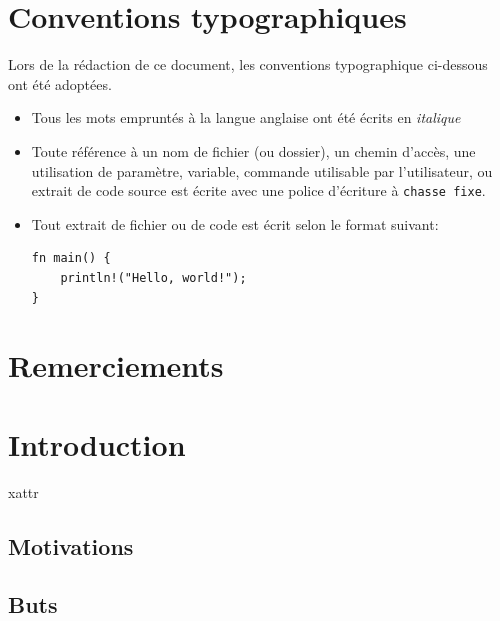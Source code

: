\documentclass[a4paper, 12pt]{article}
\newenvironment{code}{\captionsetup{type=listing}}{}
\begin{document}
\section*{Conventions typographiques}
Lors de la rédaction de ce document, les conventions typographique ci-dessous ont
été adoptées.
\begin{itemize}[label=\textbullet]
	\item Tous les mots empruntés à la langue anglaise ont été écrits en \textit{italique}
	\item Toute référence à un nom de fichier (ou dossier), un chemin d'accès, une 
    utilisation de paramètre, variable, commande utilisable par l'utilisateur, ou extrait de code 
    source est écrite avec une police d'écriture à \texttt{chasse fixe}.
	\item Tout extrait de fichier ou de code est écrit selon le format suivant:
    \bigbreak
    \begin{code}
        \begin{verbatim}
fn main() {
    println!("Hello, world!");
}
        \end{verbatim}
    \end{code}
\end{itemize}

\section*{Remerciements}

\newpage

\printglossary[type=\acronymtype,title={Acronymes}]
\newpage


\section{Introduction} %
\acrshort{xattr}
\subsection{Motivations}
\subsection{Buts}
\cite{ref3}
\end{document}
